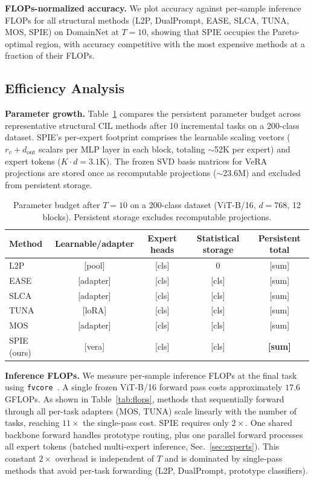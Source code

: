 \textbf{FLOPs-normalized accuracy.}
We plot accuracy against per-sample inference FLOPs for all structural methods (L2P, DualPrompt, EASE, SLCA, TUNA, MOS, SPIE) on DomainNet at $T=10$, showing that SPIE occupies the Pareto-optimal region, with accuracy competitive with the most expensive methods at a fraction of their FLOPs.

\subsection{Efficiency Analysis}
\label{sec:efficiency}

\noindent\textbf{Parameter growth.}
Table~\ref{tab:param_growth} compares the persistent parameter budget across representative structural CIL methods after 10 incremental tasks on a 200-class dataset. SPIE's per-expert footprint comprises the learnable scaling vectors ($r_v + d_{\text{out}}$ scalars per MLP layer in each block, totaling $\sim$52K per expert) and expert tokens ($K \cdot d = 3.1$K). The frozen SVD basis matrices for VeRA projections are stored once as recomputable projections ($\sim$23.6M) and excluded from persistent storage.

\begin{table}[h]
\centering
\caption{Parameter budget after $T=10$ on a 200-class dataset (ViT-B/16, $d=768$, 12 blocks). Persistent storage excludes recomputable projections.}
\label{tab:param_growth}
\small
\begin{tabular}{lcccc}
\toprule
Method & Learnable/adapter & Expert heads & Statistical storage & Persistent total \\
\midrule
L2P          & [pool]        & [cls]         & 0      & [sum] \\
EASE         & [adapter]     & [cls]         & [cls]  & [sum] \\
SLCA         & [adapter]     & [cls]         & [cls]  & [sum] \\
TUNA         & [loRA]        & [cls]         & [cls]  & [sum] \\
MOS          & [adapter]     & [cls]         & [cls]  & [sum] \\
SPIE (ours)  & [vera]        & [cls]         & [cls]  & \textbf{[sum]} \\
\bottomrule
\end{tabular}
\end{table}

\noindent\textbf{Inference FLOPs.}
We measure per-sample inference FLOPs at the final task using \texttt{fvcore}~\cite{fvcore}. A single frozen ViT-B/16 forward pass costs approximately $17.6$ GFLOPs. As shown in Table~\ref{tab:flops}, methods that sequentially forward through all per-task adapters (MOS, TUNA) scale linearly with the number of tasks, reaching $11\times$ the single-pass cost. SPIE requires only $2\times$. One shared backbone forward handles prototype routing, plus one parallel forward processes all expert tokens (batched multi-expert inference, Sec.~\ref{sec:experts}). This constant $2\times$ overhead is independent of $T$ and is dominated by single-pass methods that avoid per-task forwarding (L2P, DualPrompt, prototype classifiers).

